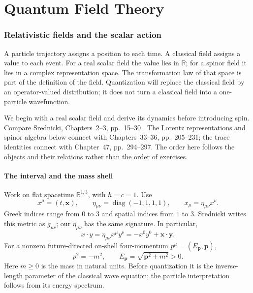 \part{Quantum Field Theory}

\section{Relativistic fields and the scalar action}\label{qft:sec:scalar}
A particle trajectory assigns a position to each time. A classical field
assigns a value to each event. For a real scalar field the value lies in
$\mathbb R$; for a spinor field it lies in a complex representation space.
The transformation law of that space is part of the definition of the
field. Quantization will replace the classical field by an
operator-valued distribution; it does not turn a classical field into a
one-particle wavefunction.

We begin with a real scalar field and derive its dynamics before introducing
spin. Compare Srednicki, Chapters~2--3, pp.~15--30
\cite{MSrednicki2007}. The Lorentz representations and spinor algebra below
connect with Chapters~33--36, pp.~205--231; the trace identities connect
with Chapter~47, pp.~294--297. The order here follows the objects and their
relations rather than the order of exercises.

\subsection{The interval and the mass shell}
Work on flat spacetime $\mathbb R^{1,3}$, with $\hbar=c=1$. Use
\begin{equation}\label{qft:metric}
 x^\mu=(t,\mathbf x),\qquad
 \eta_{\mu\nu}=\operatorname{diag}(-1,1,1,1),\qquad
 x_\mu=\eta_{\mu\nu}x^\nu .
\end{equation}
Greek indices range from $0$ to $3$ and spatial indices from $1$ to $3$.
Srednicki writes this metric as $g_{\mu\nu}$; our $\eta_{\mu\nu}$ has the
same signature. In particular,
\begin{equation}\label{qft:interval}
 x\cdot y=\eta_{\mu\nu}x^\mu y^\nu
 =-x^0y^0+\mathbf x\cdot\mathbf y .
\end{equation}
For a nonzero future-directed on-shell four-momentum $p^\mu=(E_{\mathbf p},\mathbf p)$,
\begin{equation}\label{qft:mass-shell}
 p^2=-m^2,\qquad
 E_{\mathbf p}=\sqrt{\mathbf p^2+m^2}>0 .
\end{equation}
Here $m\geq0$ is the mass in natural units. Before quantization it is the
inverse-length parameter of the classical wave equation; the particle
interpretation follows from its energy spectrum.

